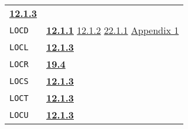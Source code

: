 \documentclass[a4paper]{scrbook}
\begin{document}
\begin{longtable}[]{@{}ll@{}}
\begin{minipage}[t]{0.70\columnwidth}
\textbf{\href{12-locatives.md\#1213-at}{12.1.3}}\strut
\end{minipage}\tabularnewline
\begin{minipage}[t]{0.24\columnwidth}\raggedright\strut
\texttt{LOCD}\strut
\end{minipage} & \begin{minipage}[t]{0.70\columnwidth}\raggedright\strut
\textbf{\href{12-locatives.md\#1211-lloc}{12.1.1}} \href{12-locatives.md\#1212-gloc}{12.1.2}
\href{22-storage-management.md\#2211-stacks-and-other-internal-vectors}{22.1.1}
\href{appendix-1-a-look-inside.md\#appendix-1-a-look-inside}{Appendix 1}\strut
\end{minipage}\tabularnewline
\begin{minipage}[t]{0.24\columnwidth}\raggedright\strut
\texttt{LOCL}\strut
\end{minipage} & \begin{minipage}[t]{0.70\columnwidth}\raggedright\strut
\textbf{\href{12-locatives.md\#1213-at}{12.1.3}}\strut
\end{minipage}\tabularnewline
\begin{minipage}[t]{0.24\columnwidth}\raggedright\strut
\texttt{LOCR}\strut
\end{minipage} & \begin{minipage}[t]{0.70\columnwidth}\raggedright\strut
\textbf{\href{19-compiled-programs.md\#194-pure-and-impure-code}{19.4}}\strut
\end{minipage}\tabularnewline
\begin{minipage}[t]{0.24\columnwidth}\raggedright\strut
\texttt{LOCS}\strut
\end{minipage} & \begin{minipage}[t]{0.70\columnwidth}\raggedright\strut
\textbf{\href{12-locatives.md\#1213-at}{12.1.3}}\strut
\end{minipage}\tabularnewline
\begin{minipage}[t]{0.24\columnwidth}\raggedright\strut
\texttt{LOCT}\strut
\end{minipage} & \begin{minipage}[t]{0.70\columnwidth}\raggedright\strut
\textbf{\href{12-locatives.md\#1213-at}{12.1.3}}\strut
\end{minipage}\tabularnewline
\begin{minipage}[t]{0.24\columnwidth}\raggedright\strut
\texttt{LOCU}\strut
\end{minipage} & \begin{minipage}[t]{0.70\columnwidth}\raggedright\strut
\textbf{\href{12-locatives.md\#1213-at}{12.1.3}}\strut

\end{minipage}
\end{longtable}
\end{document}
